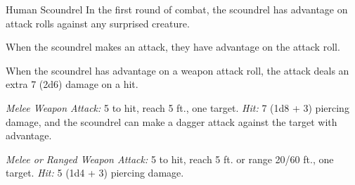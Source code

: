 \documentclass[10pt,a4paper,twoside,bg=print,twocolumn,openany,nodeprecatedcode]{dndbook}
\begin{document}
\begin{DndMonster}[float=t]{Human Scoundrel}
\DndMonsterBasics[
armor-class = {15 (studded leather armor)},
hit-points = {\DndDice{10d8 + 10}},
speed = {30 ft.}
]
\DndMonsterAbilityScores[
 str = 13,
 dex = 16,
 con = 12,
 int = 10,
 wis = 10,
 cha = 14
]
\DndMonsterDetails[
skills = {Deception +4, Sleight Of Hand +5, Stealth +5},
languages = {Common},
challenge = 3,
]
In the first round of combat, the scoundrel has advantage on attack rolls against any surprised creature.

When the scoundrel makes an attack, they have advantage on the attack roll.

When the scoundrel has advantage on a weapon attack roll, the attack deals an extra 7 (2d6) damage on a hit.

\textsl{Melee Weapon Attack:} 5 to hit, reach 5 ft., one target. \textsl{Hit:} 7 (1d8 + 3) piercing damage, and the scoundrel can make a dagger attack against the target with advantage.

\textsl{Melee or Ranged Weapon Attack:} 5 to hit, reach 5 ft. or range 20/60 ft., one target. \textsl{Hit:} 5 (1d4 + 3) piercing damage.

\end{DndMonster}
\end{document}
